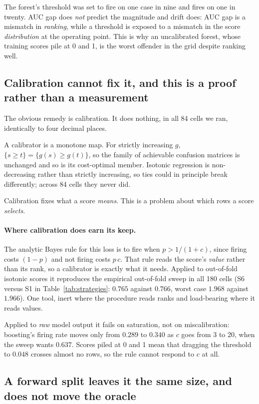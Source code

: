 \documentclass[11pt]{article}
\begin{document}
The forest's threshold was set to fire on one case in nine and fires on one in twenty. AUC gap
does \emph{not} predict the magnitude and drift does: AUC gap is a mismatch in \emph{ranking},
while a threshold is exposed to a mismatch in the score \emph{distribution} at the operating
point. This is why an uncalibrated forest, whose training scores pile at 0 and 1, is the worst
offender in the grid despite ranking well.

\subsection{Calibration cannot fix it, and this is a proof rather than a measurement}

The obvious remedy is calibration. It does nothing, in all 84 cells we ran, identically to four
decimal places.

A calibrator is a monotone map. For strictly increasing $g$, $\{s \ge t\} = \{g(s) \ge g(t)\}$,
so the family of achievable confusion matrices is unchanged and so is its cost-optimal member.
Isotonic regression is non-decreasing rather than strictly increasing, so ties could in principle
break differently; across 84 cells they never did.

Calibration fixes what a score \emph{means}. This is a problem about which rows a score
\emph{selects}.

\paragraph{Where calibration does earn its keep.} The analytic Bayes rule for this loss is to
fire when $p > 1/(1+c)$, since firing costs $(1-p)$ and not firing costs $p\,c$. That rule reads
the score's \emph{value} rather than its rank, so a calibrator is exactly what it needs. Applied
to out-of-fold isotonic scores it reproduces the empirical out-of-fold sweep in all 180 cells
(S6 versus S1 in Table~\ref{tab:strategies}: $0.765$ against $0.766$, worst case $1.968$ against
$1.966$). One tool, inert where the procedure reads ranks and load-bearing where it reads values.

Applied to \emph{raw} model output it fails on saturation, not on miscalibration: boosting's
firing rate moves only from $0.289$ to $0.340$ as $c$ goes from 3 to 20, when the sweep wants
$0.637$. Scores piled at 0 and 1 mean that dragging the threshold to $0.048$ crosses almost no
rows, so the rule cannot respond to $c$ at all.

\subsection{A forward split leaves it the same size, and does not move the oracle}
\label{sec:temporal}
\end{document}
